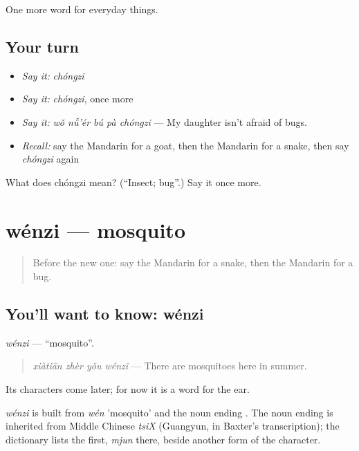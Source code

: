 \begin{grammarlens}[title={What you've built}]
One more word for everyday things.
\end{grammarlens}

\subsection*{Your turn}
\begin{itemize}
\raggedright
  \item \emph{Say it:} \emph{chóngzi}
  \item \emph{Say it:} \emph{chóngzi}, once more
  \item \emph{Say it:} \emph{wǒ nǚ'ér bú pà chóngzi} — My daughter isn't afraid of bugs.
  \item \emph{Recall:} say the Mandarin for a goat, then the Mandarin for a snake, then say \emph{chóngzi} again
\end{itemize}

\begin{tcolorbox}[breakable,colback=teal!4,colframe=teal!35!black,title={Before you move on}]
What does chóngzi mean? (\textquotedblleft{}Insect; bug\textquotedblright{}.) Say it once more.
\end{tcolorbox}
\section[wénzi]{wénzi — mosquito}

\label{lesson:ZH-C242-wenzi}



\begin{quote}
Before the new one: say the Mandarin for a snake, then the Mandarin for a bug.
\end{quote}

\subsection*{You'll want to know: wénzi}
\emph{wénzi} — \textquotedblleft{}mosquito\textquotedblright{}.

\begin{quote}
\emph{xiàtiān zhèr yǒu wénzi} — There are mosquitoes here in summer.
\end{quote}

Its characters come later; for now it is a word for the ear.

\begin{cousinweb}
\emph{wénzi} is built from \emph{wén} 'mosquito' and the noun ending . The noun ending is inherited from Middle Chinese \emph{tsiX} (Guangyun, in Baxter's transcription); the dictionary lists the first, \emph{mjun} there, beside another form of the character.
\end{cousinweb}

